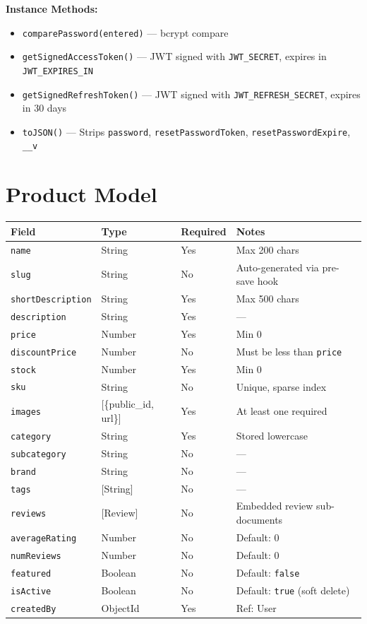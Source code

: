 \textbf{Instance Methods:}
\begin{itemize}
  \item \texttt{comparePassword(entered)} --- bcrypt compare
  \item \texttt{getSignedAccessToken()} --- JWT signed with \texttt{JWT\_SECRET}, expires in \texttt{JWT\_EXPIRES\_IN}
  \item \texttt{getSignedRefreshToken()} --- JWT signed with \texttt{JWT\_REFRESH\_SECRET}, expires in 30 days
  \item \texttt{toJSON()} --- Strips \texttt{password}, \texttt{resetPasswordToken}, \texttt{resetPasswordExpire}, \texttt{\_\_v}
\end{itemize}

\section{Product Model}

\begin{longtable}{@{}p{3.5cm}p{3cm}p{2cm}p{5.5cm}@{}}
  \toprule
  \textbf{Field} & \textbf{Type} & \textbf{Required} & \textbf{Notes} \\
  \midrule
  \texttt{name}              & String    & Yes & Max 200 chars \\
  \texttt{slug}              & String    & No  & Auto-generated via pre-save hook \\
  \texttt{shortDescription}  & String    & Yes & Max 500 chars \\
  \texttt{description}       & String    & Yes & --- \\
  \texttt{price}             & Number    & Yes & Min 0 \\
  \texttt{discountPrice}     & Number    & No  & Must be less than \texttt{price} \\
  \texttt{stock}             & Number    & Yes & Min 0 \\
  \texttt{sku}               & String    & No  & Unique, sparse index \\
  \texttt{images}            & [\{public\_id, url\}] & Yes & At least one required \\
  \texttt{category}          & String    & Yes & Stored lowercase \\
  \texttt{subcategory}       & String    & No  & --- \\
  \texttt{brand}             & String    & No  & --- \\
  \texttt{tags}              & [String]  & No  & --- \\
  \texttt{reviews}           & [Review]  & No  & Embedded review sub-documents \\
  \texttt{averageRating}     & Number    & No  & Default: 0 \\
  \texttt{numReviews}        & Number    & No  & Default: 0 \\
  \texttt{featured}          & Boolean   & No  & Default: \texttt{false} \\
  \texttt{isActive}          & Boolean   & No  & Default: \texttt{true} (soft delete) \\
  \texttt{createdBy}         & ObjectId  & Yes & Ref: User \\
  \bottomrule
\end{longtable}

